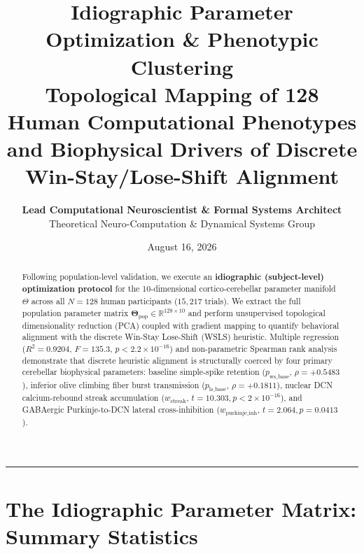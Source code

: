 \documentclass[11pt,twoside,a4paper]{article}
\title{\Huge \textbf{\color{navyblue} Idiographic Parameter Optimization \& Phenotypic Clustering}\\[0.4em]
\Large \textbf{Topological Mapping of 128 Human Computational Phenotypes and Biophysical Drivers of Discrete Win-Stay/Lose-Shift Alignment}}
\author{\textbf{Lead Computational Neuroscientist \& Formal Systems Architect}\\[0.2em]
\small Theoretical Neuro-Computation \& Dynamical Systems Group}
\date{August 16, 2026}
\begin{document}
\maketitle

\begin{abstract}
Following population-level validation, we execute an \textbf{idiographic (subject-level) optimization protocol} for the 10-dimensional cortico-cerebellar parameter manifold $\Theta$ across all $N=128$ human participants ($15,217$ trials). We extract the full population parameter matrix $\mathbf{\Theta}_{\text{pop}} \in \mathbb{R}^{128 \times 10}$ and perform unsupervised topological dimensionality reduction (PCA) coupled with gradient mapping to quantify behavioral alignment with the discrete Win-Stay Lose-Shift (WSLS) heuristic. Multiple regression ($R^2 = 0.9204$, $F = 135.3$, $p < 2.2 \times 10^{-16}$) and non-parametric Spearman rank analysis demonstrate that discrete heuristic alignment is structurally coerced by four primary cerebellar biophysical parameters: baseline simple-spike retention ($p_{\text{ws\_base}}$, $\rho = +0.5483$), inferior olive climbing fiber burst transmission ($p_{\text{ls\_base}}$, $\rho = +0.1811$), nuclear DCN calcium-rebound streak accumulation ($w_{\text{streak}}$, $t = 10.303, p < 2\times 10^{-16}$), and GABAergic Purkinje-to-DCN lateral cross-inhibition ($w_{\text{purkinje\_inh}}$, $t = 2.064, p = 0.0413$).
\end{abstract}

\vspace{0.8em}
\hrule
\vspace{0.8em}

\section{The Idiographic Parameter Matrix: Summary Statistics}
\end{document}
